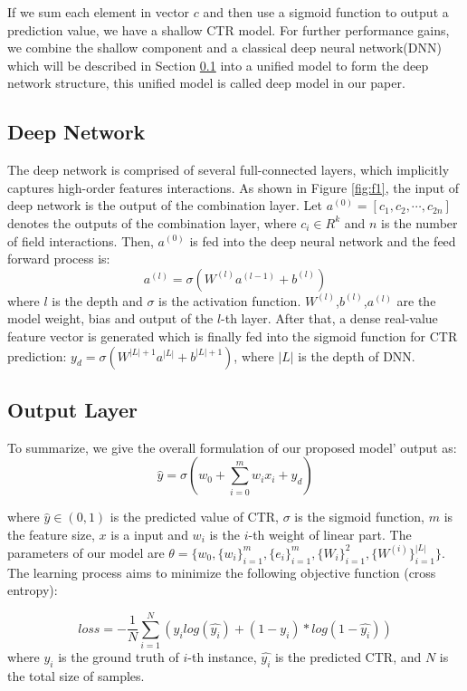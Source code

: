 \documentclass[sigconf]{acmart}
\begin{document}
If we sum each element in vector \(c\) and then use a sigmoid function
to output a prediction value, we have a shallow CTR model. For further
performance gains, we combine the shallow component and a classical deep
neural network(DNN) which will be described in Section \ref{sec:s35} into a unified model to form the deep network
structure, this unified model is called deep model in our paper.

\subsection{Deep Network}
\label{sec:s35}
The deep network is comprised of several full-connected layers, which implicitly captures
high-order features interactions. As shown in Figure \ref{fig:f1}, the input of deep network
is the output of the combination layer. Let
\(a ^{(0)} = [c_1, c_2, \cdots, c_{2n}]\) denotes the outputs of the
combination layer, where \(c_i \in R^k\) and \(n\) is the number
of field interactions. Then, \(a^{(0)}\) is fed into the deep neural
network and the feed forward process is:
\begin{equation}
    a^{(l)}=\sigma(W^{(l)}a^{(l-1)}+b^{(l)})
\end{equation}
where $l$ is the depth and $\sigma$ is the activation
function. \(W^{(l)}\),\(b^{(l)}\),\(a^{(l)}\) are the model weight, bias
and output of the \(l\)-th layer. After that, a dense real-value feature
vector is generated which is finally fed into the sigmoid function for
CTR prediction: \(y_{d}=\sigma(W^{|L|+1}a^{|L|} + b^{|L|+1})\), where \(|L|\) is the depth of DNN.

\subsection{Output Layer}
To summarize, we give the overall formulation of our proposed model'
output as:
\begin{equation}
    \hat{y}=\sigma(w_0 + \sum_{i=0}^m{w_ix_i}+y_{d})
\end{equation}

where $\hat{y}\in(0,1)$ is the predicted value of CTR, $\sigma$ is
the sigmoid function, $m$ is the feature size, $x$ is a input and
$w_i$ is the $i$-th weight of linear part. The parameters of our model are $\theta=\{w_0, \{w_i\}_{i=1}^{m},\{e_i\}_{i=1}^{m},\{W_i\}_{i=1}^{2},\{W^{(i)}\}_{i=1}^{|L|}\}$.
The learning process aims to minimize the following objective function
(cross entropy):

\begin{equation}
   loss = {-}\frac{1}{N}\sum_{i=1}^{N}({y_i}log(\hat{y_i})+(1-y_i)*log(1-\hat{y_i})) 
\end{equation}
where \(y_i\) is the ground truth of \(i\)-th instance, \(\hat{y_i}\) is
the predicted CTR, and \(N\) is the total size of samples.
\end{document}
